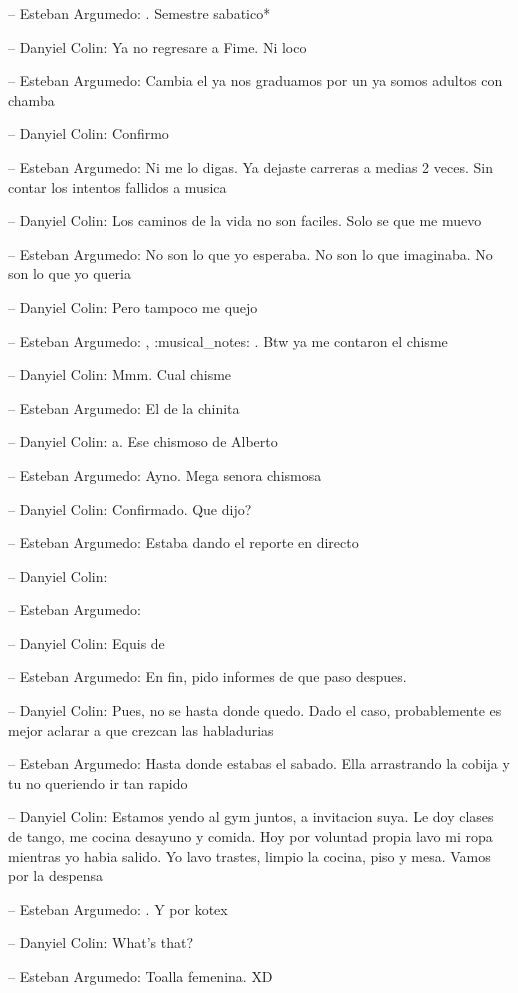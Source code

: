 -- Esteban Argumedo: . Semestre sabatico*

-- Danyiel Colin: Ya no regresare a Fime. Ni loco

-- Esteban Argumedo: Cambia el ya nos graduamos por un ya somos adultos
con chamba

-- Danyiel Colin: Confirmo

-- Esteban Argumedo: Ni me lo digas. Ya dejaste carreras a medias 2
veces. Sin contar los intentos fallidos a musica

-- Danyiel Colin: Los caminos de la vida no son faciles. Solo se que me
muevo

-- Esteban Argumedo: No son lo que yo esperaba. No son lo que imaginaba.
No son lo que yo queria

-- Danyiel Colin: Pero tampoco me quejo

-- Esteban Argumedo: , :musical\_notes: . Btw ya me contaron el chisme

-- Danyiel Colin: Mmm. Cual chisme

-- Esteban Argumedo: El de la chinita

-- Danyiel Colin: a. Ese chismoso de Alberto

-- Esteban Argumedo: Ayno. Mega senora chismosa

-- Danyiel Colin: Confirmado. Que dijo?

-- Esteban Argumedo: Estaba dando el reporte en directo

-- Danyiel Colin:

-- Esteban Argumedo:

-- Danyiel Colin: Equis de

-- Esteban Argumedo: En fin, pido informes de que paso despues.

-- Danyiel Colin: Pues, no se hasta donde quedo. Dado el caso,
probablemente es mejor aclarar a que crezcan las habladurias

-- Esteban Argumedo: Hasta donde estabas el sabado. Ella arrastrando la
cobija y tu no queriendo ir tan rapido

-- Danyiel Colin: Estamos yendo al gym juntos, a invitacion suya. Le doy
clases de tango, me cocina desayuno y comida. Hoy por voluntad propia
lavo mi ropa mientras yo habia salido. Yo lavo trastes, limpio la
cocina, piso y mesa. Vamos por la despensa

-- Esteban Argumedo: . Y por kotex

-- Danyiel Colin: What's that?

-- Esteban Argumedo: Toalla femenina. XD

